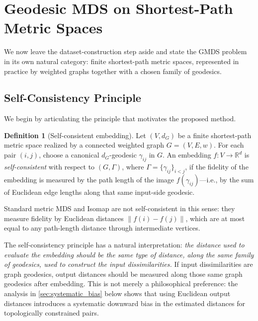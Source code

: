 \documentclass[11pt]{article}
\newcommand{\R}{\mathbb{R}}
\newcommand{\norm}[1]{\left\|#1\right\|}
\theoremstyle{definition}
\newtheorem{definition}{Definition}[section]
\theoremstyle{plain}
\theoremstyle{remark}
\begin{document}
\section{Geodesic MDS on Shortest-Path Metric Spaces}
\label{sec:geodesic_mds_v4}
\label{sec:geodesic_mds}

We now leave the dataset-construction step aside and state the GMDS problem in
its own natural category: finite shortest-path metric spaces, represented in
practice by weighted graphs together with a chosen family of geodesics.

\subsection{Self-Consistency Principle}
\label{sec:self_consistency}

We begin by articulating the principle that motivates the proposed method.

\begin{definition}[Self-consistent embedding]
  \label{def:self_consistency}
  Let $(V, d_G)$ be a finite shortest-path metric space realized by a
  connected weighted graph $G = (V, E, w)$.  For each pair $(i,j)$, choose a
  canonical $d_G$-geodesic $\gamma_{ij}$ in $G$.  An embedding
  $f: V \to \R^d$ is
  \emph{self-consistent} with respect to $(G, \Gamma)$, where
  $\Gamma = \{\gamma_{ij}\}_{i<j}$, if the fidelity of the embedding is
  measured by the path length of the image $f(\gamma_{ij})$---i.e., by the
  sum of Euclidean edge lengths along that same input-side geodesic.
\end{definition}

Standard metric MDS and Isomap are not self-consistent in this sense:
they measure fidelity by Euclidean distances $\norm{f(i) - f(j)}$, which
are at most equal to any path-length distance through intermediate vertices.

The self-consistency principle has a natural interpretation:
\emph{the distance used to evaluate the embedding should be the same
type of distance, along the same family of geodesics, used to construct
the input dissimilarities.}
If input dissimilarities are graph geodesics, output distances should be
measured along those same graph geodesics after embedding.  This is not
merely a philosophical preference: the
analysis in \cref{sec:systematic_bias} below shows that using Euclidean
output distances introduces a systematic downward bias in the estimated
distances for topologically constrained pairs.
\end{document}
